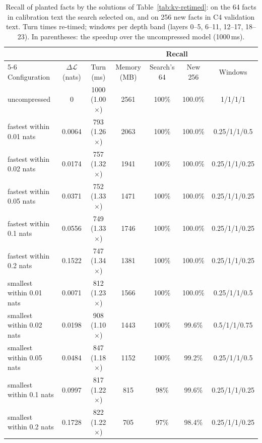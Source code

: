 \documentclass[11pt]{article}
\newcommand{\dloss}{\Delta\mathcal{L}}
\begin{document}
\begin{table}[htbp]
\centering
\footnotesize
\setlength{\tabcolsep}{4pt}
\begin{tabular}{lcccccc}
\toprule
& & & & \multicolumn{2}{c}{Recall} & \\
\cmidrule(lr){5-6}
Configuration & $\dloss$ (nats) & Turn (ms) & Memory (MB) & Search's 64 & New 256 & Windows \\
\midrule
uncompressed                 & 0      & 1000 (1.00$\times$) & 2561 & 100\% & 100.0\% & 1/1/1/1 \\
\midrule
fastest within 0.01 nats     & 0.0064 & 793 (1.26$\times$) & 2063 & 100\% & 100.0\% & 0.25/1/1/0.5 \\
fastest within 0.02 nats     & 0.0174 & 757 (1.32$\times$) & 1941 & 100\% & 100.0\% & 0.25/1/1/0.25 \\
fastest within 0.05 nats     & 0.0371 & 752 (1.33$\times$) & 1471 & 100\% & 100.0\% & 0.25/1/1/0.25 \\
fastest within 0.1 nats      & 0.0556 & 749 (1.33$\times$) & 1746 & 100\% & 100.0\% & 0.25/1/1/0.25 \\
fastest within 0.2 nats      & 0.1522 & 747 (1.34$\times$) & 1381 & 100\% & 100.0\% & 0.25/1/1/0.25 \\
\midrule
smallest within 0.01 nats    & 0.0071 & 812 (1.23$\times$) & 1566 & 100\% & 100.0\% & 0.25/1/1/0.5 \\
smallest within 0.02 nats    & 0.0198 & 908 (1.10$\times$) & 1443 & 100\% & 99.6\%  & 0.5/1/1/0.75 \\
smallest within 0.05 nats    & 0.0484 & 847 (1.18$\times$) & 1152 & 100\% & 99.2\%  & 0.25/1/1/0.5 \\
smallest within 0.1 nats     & 0.0997 & 817 (1.22$\times$) &  815 & 98\%  & 99.6\%  & 0.25/1/1/0.25 \\
smallest within 0.2 nats     & 0.1728 & 822 (1.22$\times$) &  705 & 97\%  & 98.4\%  & 0.25/1/1/0.25 \\
\bottomrule
\end{tabular}
\caption{Recall of planted facts by the solutions of Table~\ref{tab:kv-retimed}: on the 64 facts in
calibration text the search selected on, and on 256 new facts in C4 validation text. Turn times re-timed;
windows per depth band (layers 0--5, 6--11, 12--17, 18--23). In parentheses: the speedup over the uncompressed model (1000\,ms).}
\label{tab:kv-recall}
\end{table}
\end{document}
